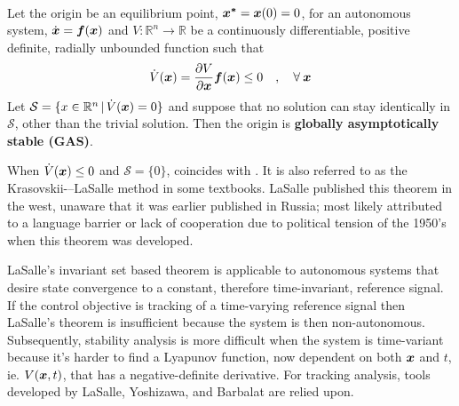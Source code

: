 \documentclass[12pt]{ucthesis}
\begin{document}
\begin{cor} \alignright \citet[Cor. 3.2]{Khalil1996} \label{cor: barbashin-krasovskii}\\
	Let the origin be an equilibrium point, $\boldsymbol{x^*}=\boldsymbol{x}(0)=0$, for an autonomous system, $\dot{\boldsymbol{x}} = \boldsymbol{f}(\boldsymbol{x})$ and $V:\mathbb{R}^n \rightarrow \mathbb{R}$ be a continuously differentiable, positive definite, radially unbounded function such that
		\begin{equation}
			\dot{V}(\boldsymbol{x}) = \frac{\partial V}{\partial\boldsymbol{x}} \boldsymbol{f}(\boldsymbol{x}) \leq 0 \quad,\quad \forall \: \boldsymbol{x}
			\label{eq: barbashin-krasovskii}
		\end{equation}
	Let $\textstyle \mathcal{S} = \{  x \in \mathbb{R}^n \,|\, \dot{V}(\boldsymbol{x})=0\}$ and suppose that no solution can stay identically in $\mathcal{S}$, other than the trivial solution. Then the origin is \textbf{globally asymptotically stable (GAS)}.
\end{cor}

\begin{rem}
	When $\dot{V}(\boldsymbol{x}) \leq 0$ and $\mathcal{S} = \{0\}$,  coincides with . It is also referred to as the Krasovskii-–LaSalle method in some textbooks. LaSalle published this theorem in the west, unaware that it was earlier published in Russia; most likely attributed to a language barrier or lack of cooperation due to political tension of the 1950's when this theorem was developed. %
\end{rem}

LaSalle's invariant set based theorem is applicable to autonomous systems that desire state convergence to a constant, therefore time-invariant, reference signal. If the control objective is tracking of a time-varying reference signal then LaSalle's theorem is insufficient because the system is then non-autonomous. Subsequently, stability analysis is more difficult when the system is time-variant because it's harder to find a Lyapunov function, now dependent on both $\boldsymbol{x}$ and $t$, ie. $V(\boldsymbol{x},t)$, that has a negative-definite derivative. For tracking analysis, tools developed by LaSalle, Yoshizawa, and Barbalat are relied upon. %
\end{document}
